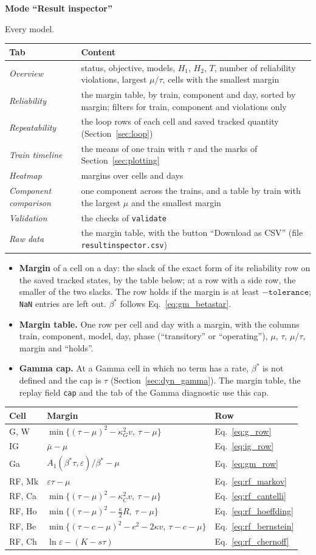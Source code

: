 \documentclass[11pt,a4paper]{article}
\makeatletter
\theoremstyle{plain}
\theoremstyle{definition}
\newcommand{\blockhead}[1]{\par\noindent\textbf{#1}\par\nobreak}
\renewcommand{\_}{\textunderscore\allowbreak{}}
\providecommand{\rejrow}[2]{{\raggedright #1\par} & {\raggedright #2\par} \\}
\providecommand{\typerow}[3]{{\raggedright #1\par} & {\raggedright #2\par} & {\raggedright #3\par} \\}
\providecommand{\tabstart}[2]{\begingroup\small\begin{longtable}{@{}#1@{}}\toprule #2 \\ \midrule \endhead}
\providecommand{\tabend}{\bottomrule\end{longtable}\endgroup}
\makeatother
\begin{document}
\blockhead{Mode ``Result inspector''}
Every model.

\tabstart{p{3.4cm}p{11.6cm}}{Tab & Content}
\rejrow{\emph{Overview}}{status, objective, models, $H_1$, $H_2$, $T$, number of reliability violations, largest $\mu/\tau$, cells with the smallest margin}
\rejrow{\emph{Reliability}}{the margin table, by train, component and day, sorted by margin; filters for train, component and violations only}
\rejrow{\emph{Repeatability}}{the loop rows of each cell and saved tracked quantity (Section~\ref{sec:loop})}
\rejrow{\emph{Train timeline}}{the means of one train with $\tau$ and the marks of Section~\ref{sec:plotting}}
\rejrow{\emph{Heatmap}}{margins over cells and days}
\rejrow{\emph{Component comparison}}{one component across the trains, and a table by train with the largest $\mu$ and the smallest margin}
\rejrow{\emph{Validation}}{the checks of \texttt{validate}}
\rejrow{\emph{Raw data}}{the margin table, with the button ``Download as CSV'' (file \texttt{result\_inspector.csv})}
\tabend

\begin{itemize}[nosep,leftmargin=1.5em]
  \item \textbf{Margin} of a cell on a day: the slack of the exact form of its reliability row on the saved tracked states, by the table below; at a row with a side row, the smaller of the two slacks. The row holds if the margin is at least $-\texttt{tolerance}$; \texttt{NaN} entries are left out. $\beta^*$ follows Eq.~\eqref{eq:gm_betastar}.
  \item \textbf{Margin table.} One row per cell and day with a margin, with the columns train, component, model, day, phase (``transitory'' or ``operating''), $\mu$, $\tau$, $\mu/\tau$, margin and ``holds''.
  \item \textbf{Gamma cap.} At a Gamma cell in which no term has a rate, $\beta^*$ is not defined and the cap is $\tau$ (Section~\ref{sec:dyn_gamma}). The margin table, the replay field \texttt{cap} and the tab of the Gamma diagnostic use this cap.
\end{itemize}

\tabstart{p{2.4cm}p{8.4cm}p{3.4cm}}{Cell & Margin & Row}
\typerow{G, W}{$\min\{(\tau-\mu)^2-\kappa_G^2 v,\ \tau-\mu\}$}{Eq.~\eqref{eq:g_row}}
\typerow{IG}{$\bar\mu-\mu$}{Eq.~\eqref{eq:ig_row}}
\typerow{Ga}{$A_1(\beta^*\tau,\varepsilon)/\beta^*-\mu$}{Eq.~\eqref{eq:gm_row}}
\typerow{RF, Mk}{$\varepsilon\tau-\mu$}{Eq.~\eqref{eq:rf_markov}}
\typerow{RF, Ca}{$\min\{(\tau-\mu)^2-\kappa_C^2 v,\ \tau-\mu\}$}{Eq.~\eqref{eq:rf_cantelli}}
\typerow{RF, Ho}{$\min\{(\tau-\mu)^2-\tfrac{\kappa}{2}R,\ \tau-\mu\}$}{Eq.~\eqref{eq:rf_hoeffding}}
\typerow{RF, Be}{$\min\{(\tau-c-\mu)^2-c^2-2\kappa v,\ \tau-c-\mu\}$}{Eq.~\eqref{eq:rf_bernstein}}
\typerow{RF, Ch}{$\ln\varepsilon-(K-s\tau)$}{Eq.~\eqref{eq:rf_chernoff}}
\tabend
\end{document}
